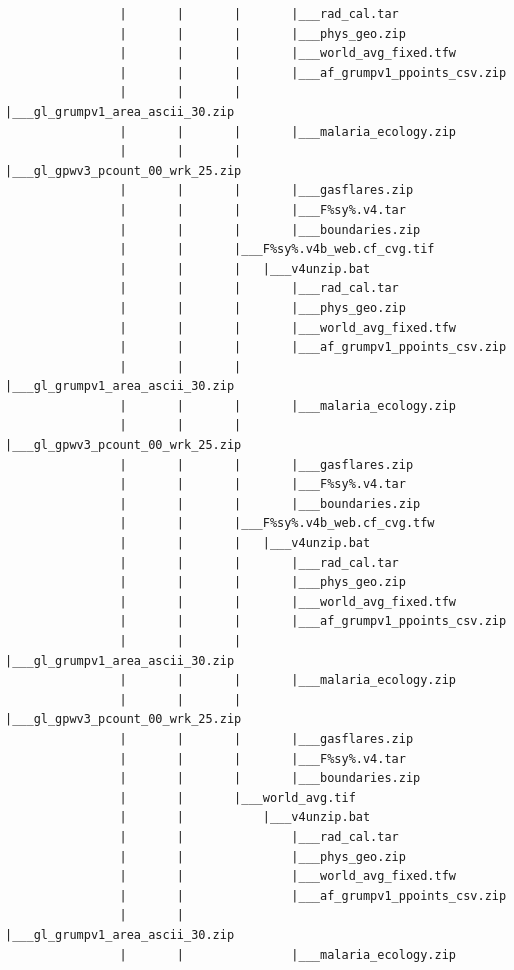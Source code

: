 \documentclass[]{book}
\begin{document}
\begin{verbatim}
                |       |       |       |___rad_cal.tar
                |       |       |       |___phys_geo.zip
                |       |       |       |___world_avg_fixed.tfw
                |       |       |       |___af_grumpv1_ppoints_csv.zip
                |       |       |       |___gl_grumpv1_area_ascii_30.zip
                |       |       |       |___malaria_ecology.zip
                |       |       |       |___gl_gpwv3_pcount_00_wrk_25.zip
                |       |       |       |___gasflares.zip
                |       |       |       |___F%sy%.v4.tar
                |       |       |       |___boundaries.zip
                |       |       |___F%sy%.v4b_web.cf_cvg.tif
                |       |       |   |___v4unzip.bat
                |       |       |       |___rad_cal.tar
                |       |       |       |___phys_geo.zip
                |       |       |       |___world_avg_fixed.tfw
                |       |       |       |___af_grumpv1_ppoints_csv.zip
                |       |       |       |___gl_grumpv1_area_ascii_30.zip
                |       |       |       |___malaria_ecology.zip
                |       |       |       |___gl_gpwv3_pcount_00_wrk_25.zip
                |       |       |       |___gasflares.zip
                |       |       |       |___F%sy%.v4.tar
                |       |       |       |___boundaries.zip
                |       |       |___F%sy%.v4b_web.cf_cvg.tfw
                |       |       |   |___v4unzip.bat
                |       |       |       |___rad_cal.tar
                |       |       |       |___phys_geo.zip
                |       |       |       |___world_avg_fixed.tfw
                |       |       |       |___af_grumpv1_ppoints_csv.zip
                |       |       |       |___gl_grumpv1_area_ascii_30.zip
                |       |       |       |___malaria_ecology.zip
                |       |       |       |___gl_gpwv3_pcount_00_wrk_25.zip
                |       |       |       |___gasflares.zip
                |       |       |       |___F%sy%.v4.tar
                |       |       |       |___boundaries.zip
                |       |       |___world_avg.tif
                |       |           |___v4unzip.bat
                |       |               |___rad_cal.tar
                |       |               |___phys_geo.zip
                |       |               |___world_avg_fixed.tfw
                |       |               |___af_grumpv1_ppoints_csv.zip
                |       |               |___gl_grumpv1_area_ascii_30.zip
                |       |               |___malaria_ecology.zip

\end{verbatim}
\end{document}

